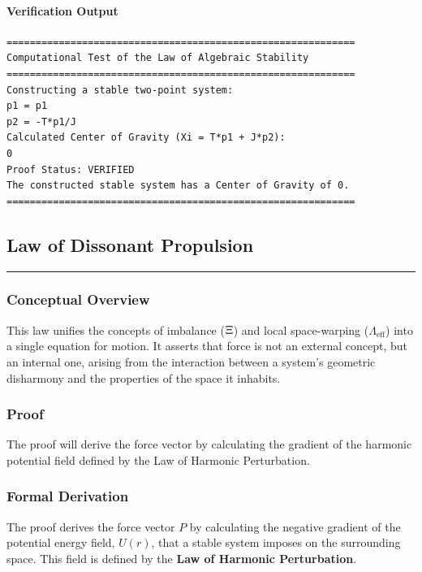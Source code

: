 \paragraph{Verification Output}
\begin{verbatim}
============================================================
Computational Test of the Law of Algebraic Stability
============================================================
Constructing a stable two-point system:
p1 = p1
p2 = -T*p1/J
Calculated Center of Gravity (Xi = T*p1 + J*p2):
0
Proof Status: VERIFIED
The constructed stable system has a Center of Gravity of 0.
============================================================
\end{verbatim}


\subsection*{Law of Dissonant Propulsion}
\hrule
\vspace{0.3cm}
\vspace{0.5cm}

\subsubsection*{Conceptual Overview}
This law unifies the concepts of imbalance ($\Xi$) and local space-warping ($\Lambda_{\text{eff}}$) into a single equation for motion.  It asserts that force is not an external concept, but an internal one, arising from the interaction between a system's geometric disharmony and the properties of the space it inhabits. 

\subsubsection*{Proof}
The proof will derive the force vector by calculating the gradient of the harmonic potential field defined by the Law of Harmonic Perturbation. 

\subsubsection*{Formal Derivation}
The proof derives the force vector $P$ by calculating the negative gradient of the potential energy field, $U(r)$, that a stable system imposes on the surrounding space. This field is defined by the \textbf{Law of Harmonic Perturbation}. 

